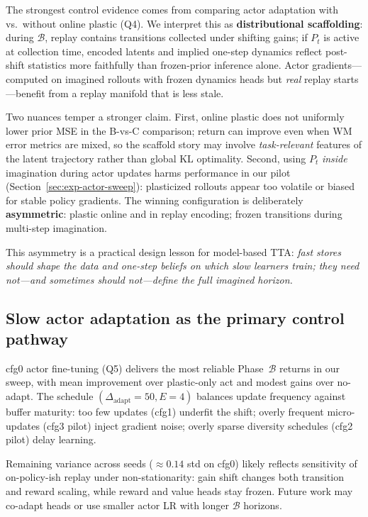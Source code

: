 The strongest control evidence comes from comparing actor adaptation with vs.\ without online plastic (Q4).
We interpret this as \textbf{distributional scaffolding}: during $\mathcal{B}$, replay contains transitions collected under shifting gains; if $P_t$ is active at collection time, encoded latents and implied one-step dynamics reflect post-shift statistics more faithfully than frozen-prior inference alone.
Actor gradients---computed on imagined rollouts with frozen dynamics heads but \emph{real} replay starts---benefit from a replay manifold that is less stale.

Two nuances temper a stronger claim.
First, online plastic does not uniformly lower prior MSE in the B-vs-C comparison; return can improve even when WM error metrics are mixed, so the scaffold story may involve \emph{task-relevant} features of the latent trajectory rather than global KL optimality.
Second, using $P_t$ \emph{inside} imagination during actor updates harms performance in our pilot (Section~\ref{sec:exp-actor-sweep}): plasticized rollouts appear too volatile or biased for stable policy gradients.
The winning configuration is deliberately \textbf{asymmetric}: plastic online and in replay encoding; frozen transitions during multi-step imagination.

This asymmetry is a practical design lesson for model-based TTA: \emph{fast stores should shape the data and one-step beliefs on which slow learners train; they need not---and sometimes should not---define the full imagined horizon.}

\subsection{Slow actor adaptation as the primary control pathway}
\label{sec:disc-actor}

cfg0 actor fine-tuning (Q5) delivers the most reliable Phase~$\mathcal{B}$ returns in our sweep, with mean improvement over plastic-only act and modest gains over no-adapt.
The schedule $(\Delta_{\mathrm{adapt}}{=}50, E{=}4)$ balances update frequency against buffer maturity: too few updates (cfg1) underfit the shift; overly frequent micro-updates (cfg3 pilot) inject gradient noise; overly sparse diversity schedules (cfg2 pilot) delay learning.

Remaining variance across seeds (${\approx}0.14$ std on cfg0) likely reflects sensitivity of on-policy-ish replay under non-stationarity: gain shift changes both transition and reward scaling, while reward and value heads stay frozen.
Future work may co-adapt heads or use smaller actor LR with longer $\mathcal{B}$ horizons.

